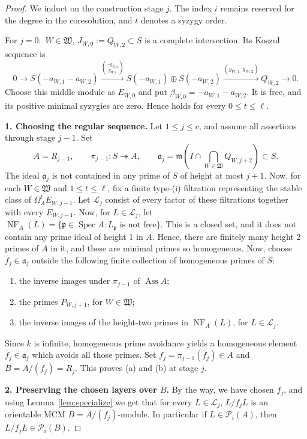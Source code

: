 \documentclass[11pt,letterpaper]{amsart}
\newcommand{\m}{\mathfrak m}
\DeclareMathOperator{\NF}{NF}
\newcommand{\x}{\xrightarrow{}}
\newcommand{\sW}{\mathfrak W}
\DeclareMathOperator{\Ass}{Ass}
\theoremstyle{plain}
\theoremstyle{definition}
\theoremstyle{remark}
\begin{document}
\begin{proof}
We induct on the construction stage \(j\). The index \(i\) remains
reserved for the degree in the coresolution, and \(t\) denotes a
syzygy order.


For $j=0:$ \(W\in\sW\), \(J_{W,0}:=Q_{W,2}\subset S\) is a complete intersection.
Its Koszul sequence is
\[
 0\x S(-a_{W,1}-a_{W,2})
 \xrightarrow{\binom{-y_{W,2}}{y_{W,1}}}
 S(-a_{W,1})\oplus S(-a_{W,2})
 \xrightarrow{(y_{W,1}\ \ y_{W,2})}Q_{W,2}\x0.
\]
Choose this 
middle module as \(E_{W,0}\) and put
\(\beta_{W,0}=-a_{W,1}-a_{W,2}\).
It is free, and its positive minimal syzygies are zero. Hence holds for every \(0\leq t\leq\ell\).

\smallskip\noindent\textbf{1. Choosing the regular sequence.}
Let \(1\leq j\leq c\), and assume all assertions through stage \(j-1\).
Set
\[
 A=R_{j-1},\qquad \pi_{j-1}:S\twoheadrightarrow A,\qquad
 \mathfrak a_j=\m\left(I\cap\bigcap_{W\in\sW}Q_{W,j+2}\right)\subset S.
\]
The ideal \(\mathfrak a_j\) is not contained in any prime of \(S\) of height
at most \(j+1\). 
Now, for each \(W\in\sW\) and \(1\leq t\leq\ell\), fix a finite
type-(i) filtration representing the stable class of
\(\Omega_A^tE_{W,j-1}\). Let \(\mathcal L_j\) consist of every factor
of these filtrations together with every \(E_{W,j-1}\).
Now, for \(L\in\mathcal L_j\), let
\(\NF_A(L)=\{\mathfrak p\in\operatorname{Spec}A:
L_{\mathfrak p}\text{ is not free}\}\).
This is a closed set, and it does not contain any prime ideal of height 1 in $A$. Hence, there are finitely many height 2 primes of $A$ in it, and these are minimal primes so homogeneous. Now, choose \(\overline{f}_j\in\mathfrak a_j\) outside the following finite collection
of homogeneous primes of \(S\):
\begin{enumerate}
\item[$(i)$] the inverse images under \(\pi_{j-1}\) of \(\Ass A\);
\item[$(ii)$] the primes \(P_{W,j+1}\), for \(W\in\sW\);
\item[$(iii)$] the inverse images of the height-two primes in \(\NF_A(L)\),
for \(L\in\mathcal L_j\).
\end{enumerate}

Since $k$ is infinite, homogeneous prime avoidance yields a
homogeneous element $\overline{f}_j\in \mathfrak a_j$ which avoids all those primes. Set \(f_j=\pi_{j-1}(\overline{f}_j)\in A\) and
\(B=A/(f_j)=R_j\). This proves (a) and (b) at stage \(j\).

\smallskip\noindent\textbf{2. Preserving the chosen layers over \(B\).} By the way, we have chosen $f_j$, and using Lemma~\ref{lem:specialize} we get that for every $L\in\mathcal{L}_j$, $L/f_jL$ is an orientable MCM $B=A/(f_j)$-module. In particular if $L\in\mathcal{P}_i(A)$, then $L/f_jL\in\mathcal{P}_i(B)$.


\end{proof}
\end{document}
